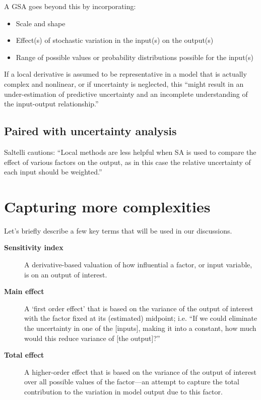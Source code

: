 \documentclass[10pt]{article}
\begin{document}

A GSA goes beyond this by incorporating:

\vspace{-8}
\begin{itemize}
    \setlength{\itemsep}{0pt}%
    \setlength{\parskip}{0pt}%
    \item Scale and shape
    \item Effect(s) of stochastic variation in the input(s) on the output(s)
    \item Range of possible values or probability distributions possible for the input(s)
\end{itemize}
\vspace{-6}

If a local derivative is assumed to be representative in a model that is actually complex and nonlinear, or if uncertainty is neglected, this ``might result in an under-estimation of predictive uncertainty and an incomplete understanding of the input-output relationship.'' \cite{Saltelli2004-ga}

\subsection{Paired with uncertainty analysis}

Saltelli cautions: ``Local methods are less helpful when SA is used to compare the effect of various factors on the output, as in this case the relative uncertainty of each input should be weighted.'' \cite{Saltelli2009-tz}


\section{Capturing more complexities}


Let's briefly describe a few key terms that will be used in our discussions. 

\vspace{-6}
\begin{description}
\item [\textbf{Sensitivity   index}] A   derivative-based   valuation   of   how   influential   a   factor,   or   input   variable,   is   on
an   output   of   interest. \cite{Saltelli2004-ga}
\item [\textbf{Main effect}] A `first order effect'  that is based on the variance of the output of interest with the factor fixed at its  (estimated) midpoint; i.e. ``If we could eliminate   the  uncertainty in one of the [inputs], making   it into a constant, how much would this reduce  variance of [the output]?'' \cite{Saltelli2004-ga}
\item [\textbf{Total effect}] A   higher-order   effect   that   is   based   on   the   variance   of   the   output   of   interest over   all   possible   values   of   the   factor---an   attempt   to   capture   the   total    contribution   to   the variation   in   model   output   due   to   this   factor.
\end{description}
\end{document}
